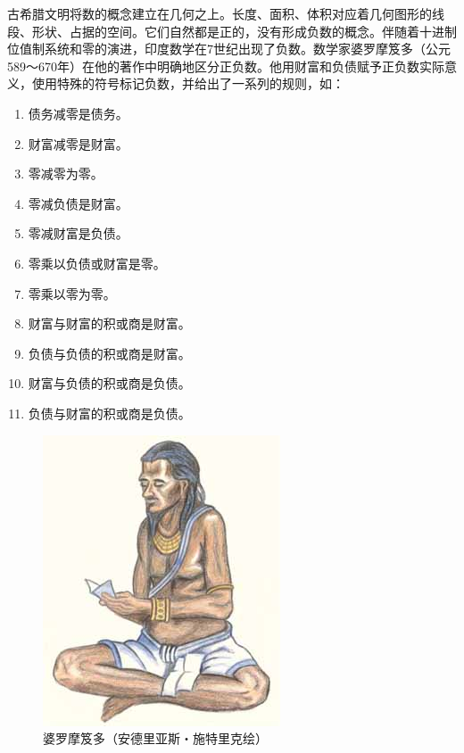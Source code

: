 \documentclass[b5paper]{ctexart}
\begin{document}
古希腊文明将数的概念建立在几何之上。长度、面积、体积对应着几何图形的线段、形状、占据的空间。它们自然都是正的，没有形成负数的概念。伴随着十进制位值制系统和零的演进，印度数学在7世纪出现了负数。数学家婆罗摩笈多（公元589～670年）在他的著作中明确地区分正负数。他用财富和负债赋予正负数实际意义，使用特殊的符号标记负数，并给出了一系列的规则，如\cite{Rogers-2011}：

\begin{multicols}{2}
\begin{enumerate}[(1)]
\item 债务减零是债务。
\item 财富减零是财富。
\item 零减零为零。
\item 零减负债是财富。
\item 零减财富是负债。
\item 零乘以负债或财富是零。
\item 零乘以零为零。
\item 财富与财富的积或商是财富。
\item 负债与负债的积或商是财富。
\item 财富与负债的积或商是负债。
\item 负债与财富的积或商是负债。
\end{enumerate}
\end{multicols}

\begin{figure}[htbp]
 \centering
 \includegraphics[scale=0.3]{img/Brahmagupta}
 \caption{婆罗摩笈多（安德里亚斯・施特里克绘）}
 \label{fig:yinyang}
\end{figure}
\end{document}
